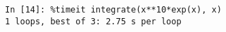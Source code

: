 ﻿\documentclass{article}
\begin{document}
\normalsize
\begin{Verbatim}
In [14]: %timeit integrate(x**10*exp(x), x)
1 loops, best of 3: 2.75 s per loop
\end{Verbatim}
\end{document}
